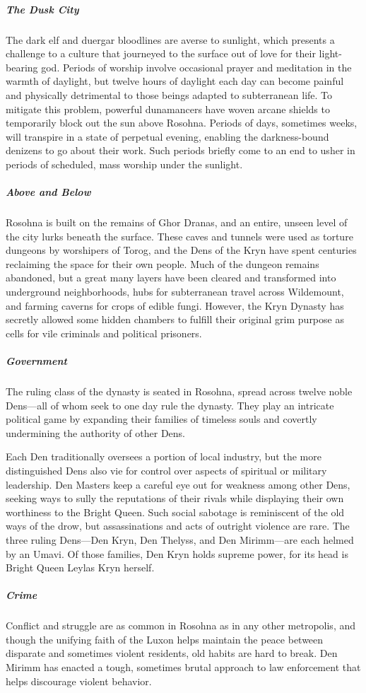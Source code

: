 \documentclass[10pt,a4paper,twoside,bg=print,twocolumn,openany,nodeprecatedcode]{dndbook}
\begin{document}
\subparagraph{The Dusk City}
The dark elf and duergar bloodlines are averse to sunlight, which presents a challenge to a culture that journeyed to the surface out of love for their light-bearing god. Periods of worship involve occasional prayer and meditation in the warmth of daylight, but twelve hours of daylight each day can become painful and physically detrimental to those beings adapted to subterranean life. To mitigate this problem, powerful dunamancers have woven arcane shields to temporarily block out the sun above Rosohna. Periods of days, sometimes weeks, will transpire in a state of perpetual evening, enabling the darkness-bound denizens to go about their work. Such periods briefly come to an end to usher in periods of scheduled, mass worship under the sunlight.

\subparagraph{Above and Below}
Rosohna is built on the remains of Ghor Dranas, and an entire, unseen level of the city lurks beneath the surface. These caves and tunnels were used as torture dungeons by worshipers of Torog, and the Dens of the Kryn have spent centuries reclaiming the space for their own people. Much of the dungeon remains abandoned, but a great many layers have been cleared and transformed into underground neighborhoods, hubs for subterranean travel across Wildemount, and farming caverns for crops of edible fungi. However, the Kryn Dynasty has secretly allowed some hidden chambers to fulfill their original grim purpose as cells for vile criminals and political prisoners.

\subparagraph{Government}
The ruling class of the dynasty is seated in Rosohna, spread across twelve noble Dens—all of whom seek to one day rule the dynasty. They play an intricate political game by expanding their families of timeless souls and covertly undermining the authority of other Dens.

Each Den traditionally oversees a portion of local industry, but the more distinguished Dens also vie for control over aspects of spiritual or military leadership. Den Masters keep a careful eye out for weakness among other Dens, seeking ways to sully the reputations of their rivals while displaying their own worthiness to the Bright Queen. Such social sabotage is reminiscent of the old ways of the drow, but assassinations and acts of outright violence are rare. The three ruling Dens—Den Kryn, Den Thelyss, and Den Mirimm—are each helmed by an Umavi. Of those families, Den Kryn holds supreme power, for its head is Bright Queen Leylas Kryn herself.

\subparagraph{Crime}
Conflict and struggle are as common in Rosohna as in any other metropolis, and though the unifying faith of the Luxon helps maintain the peace between disparate and sometimes violent residents, old habits are hard to break. Den Mirimm has enacted a tough, sometimes brutal approach to law enforcement that helps discourage violent behavior.
\end{document}
